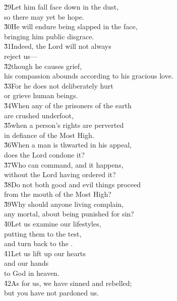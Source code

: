 \begin{poetry}
\poeml \v{29}Let him fall face down in the dust, \\
\poemll    so there may yet be hope. \\
\poeml \v{30}He will endure being slapped in the face, \\
\poemll    bringing him public disgrace. \\
\poeml \v{31}Indeed, the Lord will not always \\
\poemll    reject us--- \\
\poeml \v{32}though he causes grief, \\
\poemll    his compassion abounds according to his gracious love. \\
\poeml \v{33}For he does not deliberately hurt \\
\poemll    or grieve human beings. \\
\poeml \v{34}When any of the prisoners of the earth \\
\poemll    are crushed underfoot, \\
\poeml \v{35}when a person's rights are perverted \\
\poemll    in defiance of the Most High. \\
\poeml \v{36}When a man is thwarted in his appeal, \\
\poemll    does the Lord condone it? \\
\poeml \v{37}Who can command, and it happens, \\
\poemll    without the Lord having ordered it? \\
\poeml \v{38}Do not both good and evil things proceed \\
\poemll    from the mouth of the Most High? \\
\poeml \v{39}Why should anyone living complain, \\
\poemll    any mortal, about being punished for sin? \\
\poeml \v{40}Let us examine our lifestyles, \\
\poemll    putting them to the test, \\
\poemlll       and turn back to the . \\
\poeml \v{41}Let us lift up our hearts \\
\poemll    and our hands \\
\poemlll       to God in heaven. \\
\poeml \v{42}As for us, we have sinned and rebelled; \\
\poemll    but you have not pardoned us. \\

\end{poetry}
